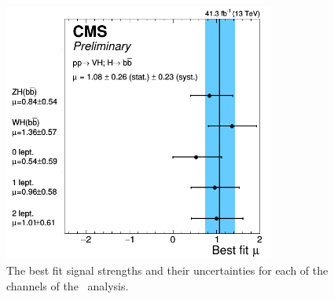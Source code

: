 \begin{figure}[htbp]
  \centering
    \includegraphics[width=3.5in]{images/MuVHbb}
    \caption[\VHbb\ Analysis Signal Strengths]{The best fit signal strengths and their uncertainties for each of the channels of the \VHbb\ analysis.}
    \label{fig:MuVHbb}
\end{figure}

